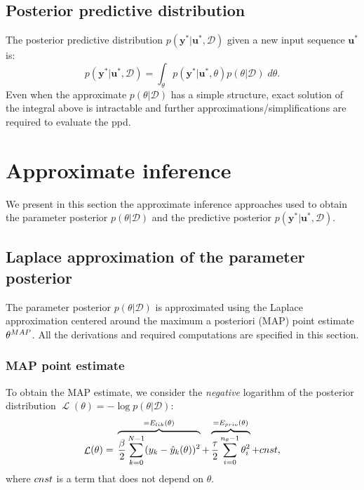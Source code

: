 \documentclass{ifacconf}
\DeclareMathOperator{\nll}{\mathcal{L}}
\newcommand{\nsamp}{N}
\newcommand{\npar}{{n_\theta}}
\newcommand{\MAP}{{\rm MAP}}
\newcommand{\tvec}[1]{{\mathbf{#1}}}
\newcommand{\mean}[1]{\hat{#1}}
\newcommand{\D}{\mathcal{D}} %
\begin{document}


\subsection{Posterior predictive distribution}
The posterior predictive distribution $p(\tvec{y}^* | \tvec{u}^*, \D)$ given a new input sequence $\tvec{u}^*$ is:%
\begin{equation}
\label{eq:posterior_predictive}
p(\tvec{y}^* | \tvec{u}^*, \D) = \int_{\theta} p(\tvec{y}^* | \tvec{u}^*, \theta) p(\theta | \D) \; d\theta.
\end{equation}
Even when the approximate $p(\theta | \D)$ has a simple structure, exact solution of the integral above is intractable and further approximations/simplifications are required to evaluate the ppd.

\section{Approximate inference}
We present in this section the approximate inference approaches used to obtain the parameter posterior $p(\theta | \D)$ and 
the predictive posterior $p(\tvec{y}^*| \tvec{u}^*, \D)$.
\subsection{Laplace approximation of the parameter posterior}
The parameter posterior $p(\theta | \D)$ is approximated using the Laplace approximation \citep{bishop2006pattern} centered around the maximum a posteriori (MAP) point estimate  ${\theta^\MAP}$. All the derivations and required computations are specified in this section.
\subsubsection{MAP point estimate}
To obtain the MAP estimate, we consider the \emph{negative} logarithm of the posterior distribution $\nll(\theta) = - \log p(\theta | \D)$:
\begin{equation}
\label{eq:nll}
 \nll(\theta) = {} \overbrace{\frac{\beta}{2} \sum_{k=0}^{\nsamp-1} (y_k - \mean{y}_k(\theta))^2}^{=E_{\rm lik}(\theta)} +
 \overbrace{\frac{\tau}{2} \sum_{i=0}^{\npar-1} \theta_i^2}^{=E_{\rm prio}(\theta)}
 + \rm{cnst},
\end{equation}
where $\rm{cnst}$ is a term that does not depend on $\theta$.
\end{document}
